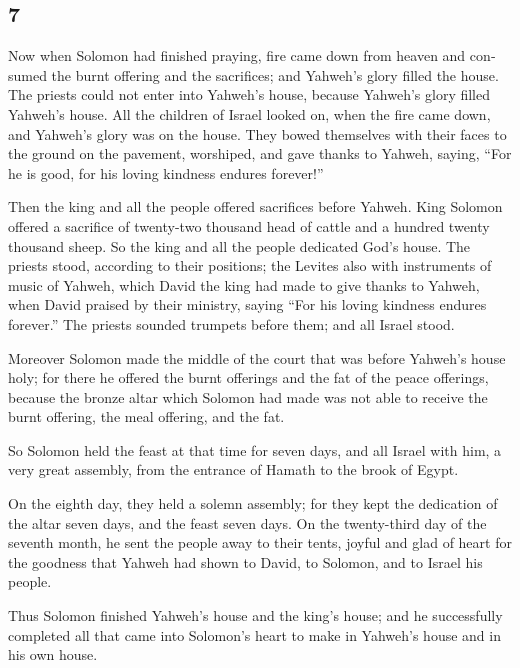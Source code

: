 \begin{paracol}{2}
\switchcolumn
\begin{otherlanguage}{english}

\hypertarget{section-13}{%
\section{7}\label{section-13}}

 Now when Solomon had finished praying, fire came down
from heaven and consumed the burnt offering and the sacrifices; and
Yahweh's glory filled the house.  The priests could not
enter into Yahweh's house, because Yahweh's glory filled Yahweh's house.
 All the children of Israel looked on, when the fire came
down, and Yahweh's glory was on the house. They bowed themselves with
their faces to the ground on the pavement, worshiped, and gave thanks to
Yahweh, saying, ``For he is good, for his loving kindness endures
forever!''

 Then the king and all the people offered sacrifices
before Yahweh.  King Solomon offered a sacrifice of
twenty-two thousand head of cattle and a hundred twenty thousand sheep.
So the king and all the people dedicated God's house.  The
priests stood, according to their positions; the Levites also with
instruments of music of Yahweh, which David the king had made to give
thanks to Yahweh, when David praised by their ministry, saying ``For his
loving kindness endures forever.'' The priests sounded trumpets before
them; and all Israel stood.

 Moreover Solomon made the middle of the court that was
before Yahweh's house holy; for there he offered the burnt offerings and
the fat of the peace offerings, because the bronze altar which Solomon
had made was not able to receive the burnt offering, the meal offering,
and the fat.

 So Solomon held the feast at that time for seven days,
and all Israel with him, a very great assembly, from the entrance of
Hamath to the brook of Egypt.

 On the eighth day, they held a solemn assembly; for they
kept the dedication of the altar seven days, and the feast seven days.
 On the twenty-third day of the seventh month, he sent
the people away to their tents, joyful and glad of heart for the
goodness that Yahweh had shown to David, to Solomon, and to Israel his
people.

 Thus Solomon finished Yahweh's house and the king's
house; and he successfully completed all that came into Solomon's heart
to make in Yahweh's house and in his own house.


\end{otherlanguage}
\end{paracol}
